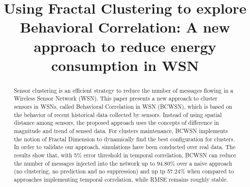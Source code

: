 \documentclass{acm_proc_article-sp}
\begin{document}
%

\title{Using Fractal Clustering to explore Behavioral Correlation: A new
approach to reduce energy consumption in WSN}



\maketitle


\begin{abstract}

Sensor clustering is an efficient strategy to reduce the number of messages
flowing in a Wireless Sensor Network (WSN).
This paper presents a new approach to cluster sensors in WSNs, called
Behavioral Correlation in WSN (BCWSN), which is based on the behavior of recent
historical data collected by sensors. Instead of using spatial distance among
sensors, the proposed approach uses the concepts of difference in magnitude and
trend of sensed data. For clusters maintenance, BCWSN implements the notion of Fractal Dimension to dynamically find the best configuration for
clusters. In order to validate our approach, simulations have been conducted
over real data. The results show that, with 5\% error threshold in temporal
correlation, BCWSN can reduce the number of messages injected into the network
up to 94.80\% over a naive approach (no clustering, no prediction and no
suppression) and up tp 57.24\% when compared to approaches implementing temporal
correlation, while RMSE remains roughly stable.

\end{abstract}

\end{document}
